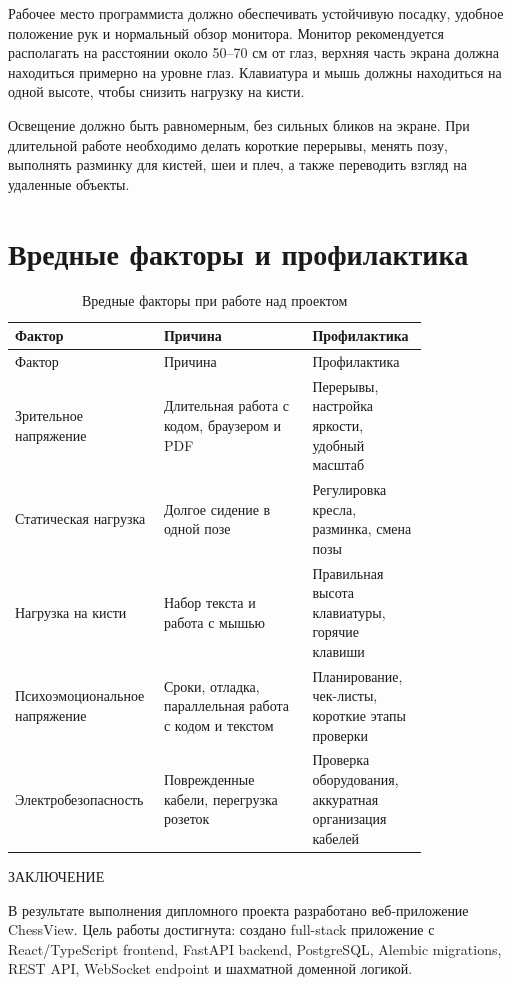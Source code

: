 \documentclass[14pt,a4paper]{extreport}
\newcommand{\unnumberedchapter}[1]{%
  \clearpage
  \phantomsection
  \addcontentsline{toc}{chapter}{#1}
  \begin{center}\fontsize{14pt}{21pt}\selectfont #1\end{center}\vspace{6pt}
}
\begin{document}
Рабочее место программиста должно обеспечивать устойчивую посадку, удобное положение рук и нормальный обзор монитора. Монитор рекомендуется располагать на расстоянии около 50--70 см от глаз, верхняя часть экрана должна находиться примерно на уровне глаз. Клавиатура и мышь должны находиться на одной высоте, чтобы снизить нагрузку на кисти.

Освещение должно быть равномерным, без сильных бликов на экране. При длительной работе необходимо делать короткие перерывы, менять позу, выполнять разминку для кистей, шеи и плеч, а также переводить взгляд на удаленные объекты.

\section{Вредные факторы и профилактика}

\begin{center}
\scriptsize
\setlength{\tabcolsep}{4pt}
\renewcommand{\arraystretch}{1.25}
\begin{longtable}{|>{\RaggedRight\arraybackslash}p{0.24\linewidth}|>{\RaggedRight\arraybackslash}p{0.34\linewidth}|>{\RaggedRight\arraybackslash}p{0.24\linewidth}|}
\caption{Вредные факторы при работе над проектом}\label{tab:safety}\\
\hline
Фактор & Причина & Профилактика\\ \hline
\endfirsthead
\hline
Фактор & Причина & Профилактика\\ \hline
\endhead
Зрительное напряжение & Длительная работа с кодом, браузером и PDF & Перерывы, настройка яркости, удобный масштаб\\ \hline
Статическая нагрузка & Долгое сидение в одной позе & Регулировка кресла, разминка, смена позы\\ \hline
Нагрузка на кисти & Набор текста и работа с мышью & Правильная высота клавиатуры, горячие клавиши\\ \hline
Психоэмоциональное напряжение & Сроки, отладка, параллельная работа с кодом и текстом & Планирование, чек-листы, короткие этапы проверки\\ \hline
Электробезопасность & Поврежденные кабели, перегрузка розеток & Проверка оборудования, аккуратная организация кабелей\\ \hline
\end{longtable}
\end{center}

\unnumberedchapter{ЗАКЛЮЧЕНИЕ}

В результате выполнения дипломного проекта разработано веб-приложение ChessView. Цель работы достигнута: создано full-stack приложение с React/TypeScript frontend, FastAPI backend, PostgreSQL, Alembic migrations, REST API, WebSocket endpoint и шахматной доменной логикой.
\end{document}
